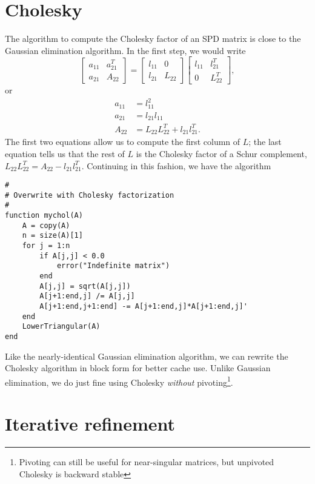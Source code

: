 \documentclass[12pt, leqno]{article} %
\begin{document}
\section{Cholesky}

The algorithm to compute the Cholesky factor of an SPD matrix is
close to the Gaussian elimination algorithm.  In the first step,
we would write
\[
  \begin{bmatrix}
    a_{11} & a_{21}^T \\
    a_{21} & A_{22}
  \end{bmatrix} =
  \begin{bmatrix}
    l_{11} & 0 \\
    l_{21} & L_{22}
  \end{bmatrix}
  \begin{bmatrix}
    l_{11} & l_{21}^T \\
        0 & L_{22}^T
  \end{bmatrix},
\]
or
\begin{align*}
  a_{11} &= l_{11}^2 \\
  a_{21} &= l_{21} l_{11} \\
  A_{22} &= L_{22} L_{22}^T + l_{21} l_{21}^T.
\end{align*}
The first two equations allow us to compute the first column of $L$;
the last equation tells us that the rest of $L$ is the Cholesky factor
of a Schur complement, $L_{22} L_{22}^T = A_{22} - l_{21} l_{21}^T$.
Continuing in this fashion, we have the algorithm
\begin{lstlisting}
#
# Overwrite with Cholesky factorization
#
function mychol(A)
    A = copy(A)
    n = size(A)[1]
    for j = 1:n
        if A[j,j] < 0.0
            error("Indefinite matrix")
        end
        A[j,j] = sqrt(A[j,j])
        A[j+1:end,j] /= A[j,j]
        A[j+1:end,j+1:end] -= A[j+1:end,j]*A[j+1:end,j]'
    end
    LowerTriangular(A)
end
\end{lstlisting}
Like the nearly-identical Gaussian elimination algorithm, we can
rewrite the Cholesky algorithm in block form for better cache use.
Unlike Gaussian elimination, we do just fine using Cholesky {\em without}
pivoting\footnote{Pivoting can still be useful for near-singular matrices,
but unpivoted Cholesky is backward stable}.


\section{Iterative refinement}
\end{document}
